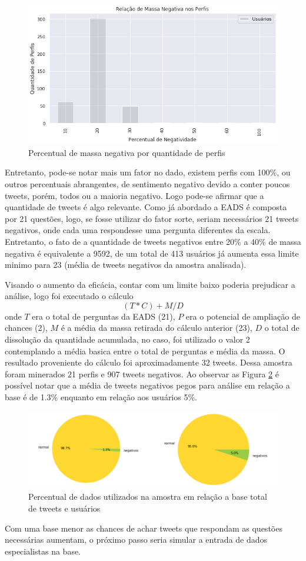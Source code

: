 \begin{figure}[!ht]
    \centering
    \includegraphics[width=.6\textwidth]{imagens/relacao-massa-neg.png}
    \caption{Percentual de massa negativa por quantidade de perfis}
    \label{fig:negative-pop-relation}
\end{figure}


Entretanto, pode-se notar mais um fator no dado, existem perfis com 100\%, ou outros percentuais abrangentes, de sentimento negativo devido a conter poucos tweets, porém, todos ou a maioria negativo. Logo pode-se afirmar que a quantidade de tweets é algo relevante. Como já abordado a EADS é composta por 21 questões, logo, se fosse utilizar do fator sorte, seriam necessários 21 tweets negativos, onde cada uma respondesse uma pergunta diferentes da escala. Entretanto, o fato de a quantidade de tweets negativos entre 20\% a 40\% de massa negativa é equivalente a 9592, de um total de 413 usuários já aumenta essa limite minimo para 23 (média de tweets negativos da amostra analisada).

Visando o aumento da eficácia, contar com um limite baixo poderia prejudicar a análise, logo foi executado o cálculo \[ (T * C) + M / D \] onde \(T\) era o total de perguntas da EADS (21), \(P\) era o potencial de ampliação de chances (2), \(M\) é a média da massa retirada do cálculo anterior (23), \(D\) o total de dissolução da quantidade acumulada, no caso, foi utilizado o valor 2 contemplando a média basica entre o total de perguntas e média da massa. O resultado proveniente do cálculo foi aproximadamente 32 tweets. Dessa amostra foram minerados 21 perfis e 907 tweets negativos. Ao observar as Figura \ref{fig:sample-relation} é possível notar que a média de tweets negativos pegos para análise em relação a base é de 1.3\% enquanto em relação aos usuários 5\%.

\begin{figure}[!ht]
    \centering
    \includegraphics[width=.6\textwidth]{imagens/relacao-amostra.png}
    \caption{Percentual de dados utilizados na amostra em relação a base total de tweets e usuários}
    \label{fig:sample-relation}
\end{figure}

Com uma base menor as chances de achar tweets que respondam as questões necessárias aumentam, o próximo passo seria simular a entrada de dados especialistas na base.
